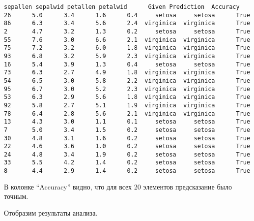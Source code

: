 \documentclass[11pt]{article}
\begin{document}
    \begin{Verbatim}[commandchars=\\\{\}]
   sepallen sepalwid petallen petalwid      Given Prediction  Accuracy
26      5.0      3.4      1.6      0.4     setosa     setosa      True
86      6.3      3.4      5.6      2.4  virginica  virginica      True
2       4.7      3.2      1.3      0.2     setosa     setosa      True
55      7.6      3.0      6.6      2.1  virginica  virginica      True
75      7.2      3.2      6.0      1.8  virginica  virginica      True
93      6.8      3.2      5.9      2.3  virginica  virginica      True
16      5.4      3.9      1.3      0.4     setosa     setosa      True
73      6.3      2.7      4.9      1.8  virginica  virginica      True
54      6.5      3.0      5.8      2.2  virginica  virginica      True
95      6.7      3.0      5.2      2.3  virginica  virginica      True
53      6.3      2.9      5.6      1.8  virginica  virginica      True
92      5.8      2.7      5.1      1.9  virginica  virginica      True
78      6.4      2.8      5.6      2.1  virginica  virginica      True
13      4.3      3.0      1.1      0.1     setosa     setosa      True
7       5.0      3.4      1.5      0.2     setosa     setosa      True
30      4.8      3.1      1.6      0.2     setosa     setosa      True
22      4.6      3.6      1.0      0.2     setosa     setosa      True
24      4.8      3.4      1.9      0.2     setosa     setosa      True
33      5.5      4.2      1.4      0.2     setosa     setosa      True
8       4.4      2.9      1.4      0.2     setosa     setosa      True
    \end{Verbatim}

    В колонке ``Accuracy'' видно, что для всех 20 элементов предсказание
было точным.

Отобразим результаты анализа.
\end{document}
